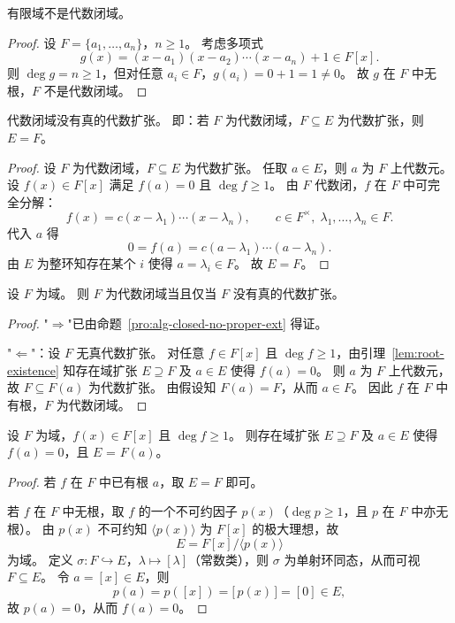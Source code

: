 \documentclass[lang=cn,a4paper,newtx]{elegantbook}
\begin{document}
\begin{proposition}
  有限域不是代数闭域。
\end{proposition}

\begin{proof}
  设 $F=\{a_1,\dots,a_n\}$，$n\ge 1$。
  考虑多项式
  \[
    g(x)=(x-a_1)(x-a_2)\cdots(x-a_n)+1\in F[x].
  \]
  则 $\deg g=n\ge 1$，但对任意 $a_i\in F$，$g(a_i)=0+1=1\ne 0$。
  故 $g$ 在 $F$ 中无根，$F$ 不是代数闭域。
\end{proof}

\begin{proposition}\label{alg-closed-no-proper-ext}
  代数闭域没有真的代数扩张。
  即：若 $F$ 为代数闭域，$F\subseteq E$ 为代数扩张，则 $E=F$。
\end{proposition}

\begin{proof}
  设 $F$ 为代数闭域，$F\subseteq E$ 为代数扩张。
  任取 $a\in E$，则 $a$ 为 $F$ 上代数元。
  设 $f(x)\in F[x]$ 满足 $f(a)=0$ 且 $\deg f\ge 1$。
  由 $F$ 代数闭，$f$ 在 $F$ 中可完全分解：
  \[
    f(x)=c(x-\lambda_1)\cdots(x-\lambda_n),\qquad c\in F^{\times},\;\lambda_1,\dots,\lambda_n\in F.
  \]
  代入 $a$ 得
  \[
    0=f(a)=c(a-\lambda_1)\cdots(a-\lambda_n).
  \]
  由 $E$ 为整环知存在某个 $i$ 使得 $a=\lambda_i\in F$。
  故 $E=F$。
\end{proof}

\begin{proposition}
  设 $F$ 为域。
  则 $F$ 为代数闭域当且仅当 $F$ 没有真的代数扩张。
\end{proposition}

\begin{proof}
  "$\Rightarrow$"已由命题~\ref{pro:alg-closed-no-proper-ext} 得证。

  "$\Leftarrow$"：设 $F$ 无真代数扩张。
  对任意 $f\in F[x]$ 且 $\deg f\ge 1$，由引理~\ref{lem:root-existence} 知存在域扩张 $E\supseteq F$ 及 $a\in E$ 使得 $f(a)=0$。
  则 $a$ 为 $F$ 上代数元，故 $F\subseteq F(a)$ 为代数扩张。
  由假设知 $F(a)=F$，从而 $a\in F$。
  因此 $f$ 在 $F$ 中有根，$F$ 为代数闭域。
\end{proof}

\begin{lemma}\label{root-existence}
  设 $F$ 为域，$f(x)\in F[x]$ 且 $\deg f\ge 1$。
  则存在域扩张 $E\supseteq F$ 及 $a\in E$ 使得 $f(a)=0$，且  $E$ = $F(a)$。
\end{lemma}

\begin{proof}
  若 $f$ 在 $F$ 中已有根 $a$，取 $E=F$ 即可。

  若 $f$ 在 $F$ 中无根，取 $f$ 的一个不可约因子 $p(x)$（$\deg p\ge 1$，且 $p$ 在 $F$ 中亦无根）。
  由 $p(x)$ 不可约知 $\langle p(x)\rangle$ 为 $F[x]$ 的极大理想，故
  \[
    E=F[x]/\langle p(x)\rangle
  \]
  为域。
  定义 $\sigma\colon F\hookrightarrow E$，$\lambda\mapsto [\lambda]$（常数类），则 $\sigma$ 为单射环同态，从而可视 $F\subseteq E$。
  令 $a=[x]\in E$，则
  \[
    p(a)=p([x])=\bigl[\,p(x)\,\bigr]=[0]\in E,
  \]
  故 $p(a)=0$，从而 $f(a)=0$。
\end{proof}
\end{document}
